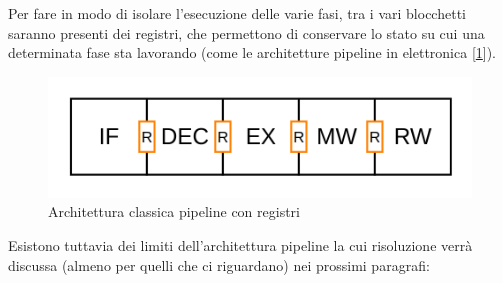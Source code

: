 Per fare in modo di isolare l'esecuzione delle varie fasi, tra i vari blocchetti saranno presenti dei registri, che permettono di conservare lo stato su cui una determinata fase sta lavorando (come le architetture pipeline in elettronica [\ref{img:pipe-reg}]). 

\begin{figure}[!ht]
    \centering
    \includegraphics[width=.5\textwidth]{img/Pipe-reg.png}
    \caption{Architettura classica pipeline con registri}\label{img:pipe-reg}
\end{figure}

Esistono tuttavia dei limiti dell'architettura pipeline la cui risoluzione verrà discussa (almeno per quelli che ci riguardano) nei prossimi paragrafi:

